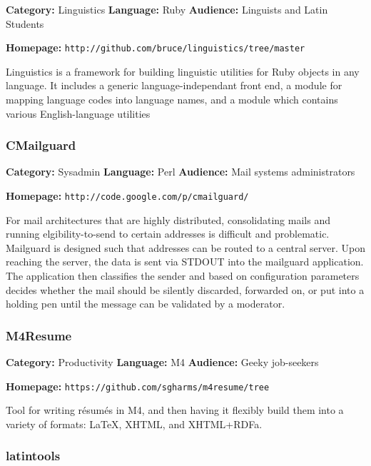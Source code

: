\documentclass[]{article}
\begin{document}
{\bf Category:} Linguistics  {\bf Language:} Ruby {\bf Audience:} Linguists and Latin Students

{\bf Homepage:} {\tt http://github.com/bruce/linguistics/tree/master}
\vspace{0.05in}

Linguistics is a framework for building linguistic utilities for Ruby objects
in any language. It includes a generic language-independant front end, a
module for mapping language codes into language names, and a module which
contains various English-language utilities





\subsubsection*{CMailguard}

{\bf Category:} Sysadmin  {\bf Language:} Perl {\bf Audience:} Mail systems administrators

{\bf Homepage:} {\tt http://code.google.com/p/cmailguard/}
\vspace{0.05in}

For mail architectures that are highly distributed, consolidating mails and running elgibility-to-send to certain addresses is difficult and problematic.  Mailguard is designed such that addresses can be routed to a central server. Upon reaching the server, the data is sent via STDOUT into the mailguard application.  The application then classifies the sender and based on configuration parameters decides whether the mail should be silently discarded, forwarded on, or put into a holding pen until the message can be validated by a moderator.




\subsubsection*{M4Resume}

{\bf Category:} Productivity  {\bf Language:} M4 {\bf Audience:} Geeky job-seekers

{\bf Homepage:} {\tt https://github.com/sgharms/m4resume/tree}
\vspace{0.05in}

Tool for writing résumés in M4, and then having it flexibly build them into a variety of formats:  \LaTeX, XHTML, and XHTML+RDFa.




\subsubsection*{latintools}
\end{document}
